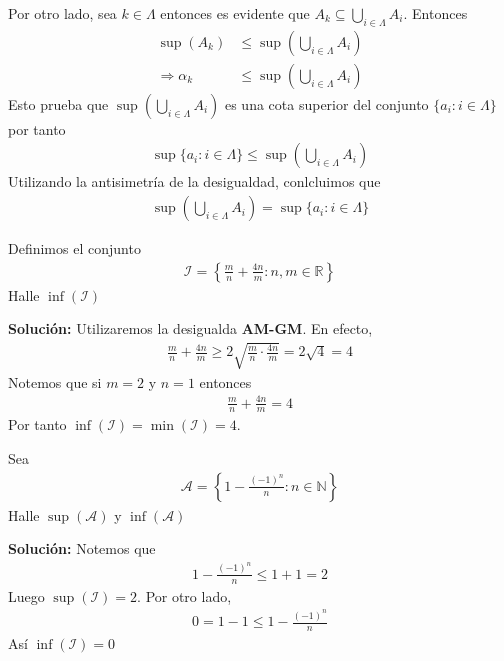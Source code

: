 \documentclass[12pt]{book}
\begin{document}
Por otro lado, sea $k \in \Lambda$ entonces es evidente que $A_k \subseteq \bigcup_{i\in \Lambda} A_i$. Entonces 
\begin{align*}
    \sup(A_k) &\leq \sup\left( \bigcup_{i\in \Lambda} A_i\right) \\
\Longrightarrow    \alpha_k &\leq \sup\left( \bigcup_{i\in \Lambda} A_i\right)
\end{align*}
Esto prueba que $\sup\left( \bigcup_{i\in \Lambda} A_i\right)$ es una cota superior del conjunto $\{a_i : i \in \Lambda \}$ por tanto 
\begin{align*}
    \sup\{a_i : i \in \Lambda\} \leq \sup\left( \bigcup_{i\in \Lambda} A_i\right)
\end{align*}
Utilizando la antisimetría de la desigualdad, conlcluimos que 
\begin{align*}
    \sup\left( \bigcup_{i\in \Lambda} A_i\right)= \sup\{a_i : i \in \Lambda\} 
\end{align*}
\begin{prob}{}{}
    Definimos el conjunto 
    \begin{align*}
        \mathcal{I} = \left\{ \frac{m}{n}+\frac{4n}{m}: n, m \in \mathbb{R} \right\} 
    \end{align*}
    Halle $\inf(\mathcal{I})$
\end{prob}
\textbf{Solución:} Utilizaremos la desigualda \textbf{AM-GM}. En efecto,
\begin{align*}
    \frac{m}{n}+\frac{4n}{m}\geq 2\sqrt{\frac{m}{n}\cdot \frac{4n}{m}} = 2 \sqrt{4}=4
\end{align*}
Notemos que si $m=2$ y $n=1$ entonces 
\begin{align*}
     \frac{m}{n}+\frac{4n}{m}=4
\end{align*}
Por tanto $\inf(\mathcal{I})=\min(\mathcal{I})=4$.
\begin{prob}{}{}
    Sea 
    \begin{align*}
        \mathcal{A}=\left\{1- \frac{(-1)^n}{n}: n \in \mathbb{N} \right\}
    \end{align*}
    Halle $\sup(\mathcal{A})$ y $\inf(\mathcal{A})$
\end{prob}
\textbf{Solución:}
Notemos que 
\begin{align*}
    1-\frac{(-1)^n}{n}\leq 1+1=2
\end{align*}
Luego $\sup(\mathcal{I})=2$. Por otro lado,
\begin{align*}
    0=1-1 \leq 1-\frac{(-1)^n}{n}
\end{align*}
Así $\inf(\mathcal{I})=0$
\end{document}
